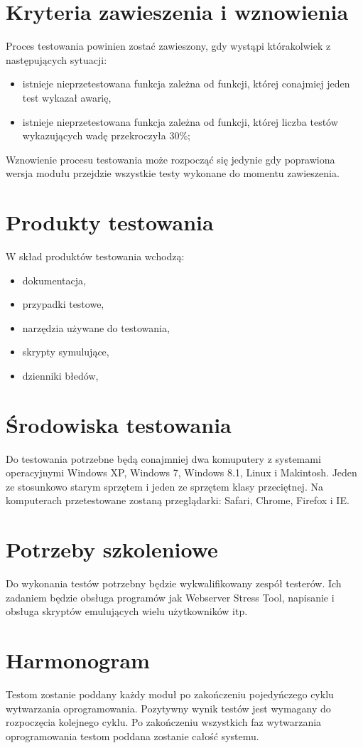 \documentclass[11pt,a4paper]{article}
\begin{document}
\section{Kryteria zawieszenia i wznowienia}
Proces testowania powinien zostać zawieszony, gdy wystąpi którakolwiek z następujących sytuacji:

	\begin{itemize}
		\item  istnieje nieprzetestowana funkcja zależna od funkcji, której conajmiej jeden test wykazał awarię,
		\item  istnieje nieprzetestowana funkcja zależna od funkcji, której liczba testów wykazujących wadę przekroczyła 30\%;
	\end{itemize}
Wznowienie procesu testowania może rozpocząć się jedynie gdy poprawiona wersja modułu przejdzie wszystkie testy wykonane do momentu zawieszenia.

\section{Produkty testowania}
W skład produktów testowania wchodzą:
	\begin{itemize}
		\item dokumentacja,
		\item przypadki testowe,
		\item narzędzia używane do testowania,
		\item skrypty symulujące,
		\item dzienniki błedów,
	\end{itemize}

\section{Środowiska testowania}
Do testowania potrzebne będą conajmniej dwa komuputery z systemami operacyjnymi Windows XP, Windows 7, Windows 8.1, Linux i Makintosh.
Jeden ze stosunkowo starym sprzętem i jeden ze sprzętem klasy przeciętnej.
Na komputerach przetestowane zostaną przeglądarki: Safari, Chrome, Firefox i IE.

\section{Potrzeby szkoleniowe}
Do wykonania testów potrzebny będzie wykwalifikowany zespół testerów. Ich zadaniem będzie obsługa programów jak Webserver Stress Tool, 
napisanie i obsługa skryptów emulujących wielu użytkowników itp.

\section{Harmonogram}
Testom zostanie poddany każdy moduł po zakończeniu pojedyńczego cyklu wytwarzania oprogramowania.
Pozytywny wynik testów jest wymagany do rozpoczęcia kolejnego cyklu.
Po zakończeniu wszystkich faz wytwarzania oprogramowania testom poddana zostanie całość systemu.
\end{document}
